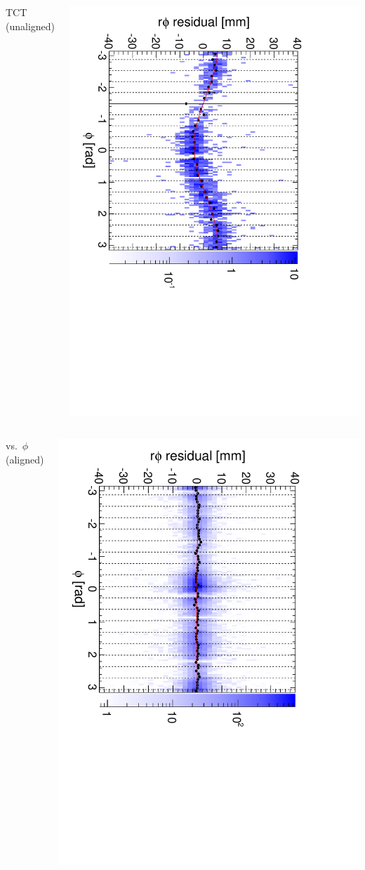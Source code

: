 \documentclass[compress]{beamer}
\begin{document}
\begin{frame}
\begin{columns}
\centering TCT (unaligned)

\includegraphics[height=\linewidth, angle=90]{diskiter01_p3to4_TST.pdf}
\end{columns}

\begin{columns}
\centering vs.\ $\phi$ (aligned)

\includegraphics[height=\linewidth, angle=90]{diskiter02_p3to4.pdf}


\end{columns}
\end{frame}
\end{document}
